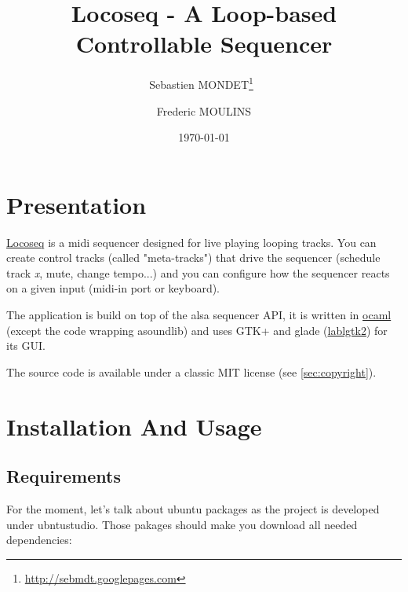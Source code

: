 

\title{Locoseq - A Loop-based Controllable Sequencer}
\author{Sebastien MONDET\thanks{\url{http://sebmdt.googlepages.com}}\ \and
Frederic MOULINS}

\date{\today}






\onecolumn
\maketitle
\tableofcontents

\newpage

\section{Presentation}

\href{http://locoseq.googlecode.com}{Locoseq} is a midi sequencer designed for
live playing looping tracks.  You can create control tracks (called
"meta-tracks") that drive the sequencer (schedule track \textit{x}, mute,
change tempo...) and you can configure how the sequencer reacts on a given
input (midi-in port or keyboard).


The application is build on top of the alsa sequencer API, it is written in
\href{http://www.ocaml.org}{ocaml}
(except the code wrapping asoundlib) and uses GTK+ and glade
(\href {http://wwwfun.kurims.kyoto-u.ac.jp/soft/lsl/lablgtk.html}{lablgtk2})
for its GUI.

The source code is available under a classic MIT license (see
\ref{sec:copyright}).



\section{Installation And Usage}

\subsection{Requirements}

For the moment, let's talk about ubuntu packages as the project is developed
under ubntustudio. Those pakages should make you download all needed
dependencies:


